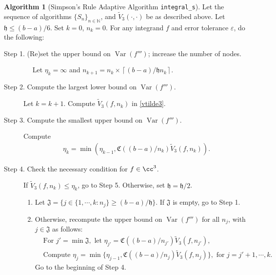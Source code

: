\documentclass{iitthesis}
\DeclareMathOperator{\Var}{Var}
\theoremstyle{definition}
\newtheorem{algo}{Algorithm}
\theoremstyle{remark}
\begin{document}
\begin{algo} [Simpson's Rule Adaptive Algorithm {\tt integral\_s}] \label{multistageintegalgosimpson}
Let the sequence of algorithms $\{S_n\}_{n\in \mathbb{N}}$, %
and $\widetilde{V}_3(\cdot,\cdot)$ be as described above.
Let $\mathfrak{h}\le (b-a)/6$. Set $k=0$, $n_{k}=0$. For any integrand $f$ and error tolerance $\varepsilon$, do the following: %
\begin{description}
\item[Step 1. (Re)set the upper bound on $\Var(f''')$; increase the number of nodes.] $\quad$ Let $\eta_{k}=\infty$ and $n_{k+1}=n_k\times\left\lceil(b-a)/\mathfrak{h}n_{k}\right\rceil$.

\item[Step 2. Compute the largest lower bound on {$\Var(f''')$}.] Let $k=k+1$. Compute  $\widetilde{V}_3(f,n_k)$ in \eqref{vtilde3}.%

\item[Step 3. Compute the smallest upper bound on {$\Var(f''')$}.] Compute
    \begin{align*}
        \eta_{k}=\min\left(\eta_{k-1},\mathfrak{C}((b-a)/n_{k})\widetilde{V}_3(f,n_k)\right).
    \end{align*}

\item[Step 4. Check the necessary condition for $f \in \cc^3$.] If $\widetilde{V}_3(f,n_k) \le \eta_{k}$, go to Step 5.
  Otherwise, set $\mathfrak{h} = \mathfrak{h}/2$.
    \begin{enumerate}[label=\alph*)]
      \item Let $\mathfrak{J}=\{j\in\{1, \cdots, k: n_{j}\}\ge (b-a)/\mathfrak{h}\}$. If $\mathfrak{J}$ is empty, go to Step 1.
      \item Otherwise, recompute the upper bound on $\Var(f''')$ for all $n_{j}$, with $j \in \mathfrak{J}$ as follows:
      \begin{align*}
        &\text{For } j'=\min\mathfrak{J}, \text{ let } \eta_{j'}=\mathfrak{C}((b-a)/n_{j'})\widetilde{V}_3(f,n_{j'}), \\
        &\text{Compute } \eta_{j}=\min\{\eta_{j-1},\mathfrak{C}((b-a)/n_{j})\widetilde{V}_3(f,n_{j})\}, \text{ for } j=j'+1, \cdots, k.
      \end{align*}
      Go to the beginning of Step 4.
    \end{enumerate}



\end{description}
\end{algo}
\end{document}

